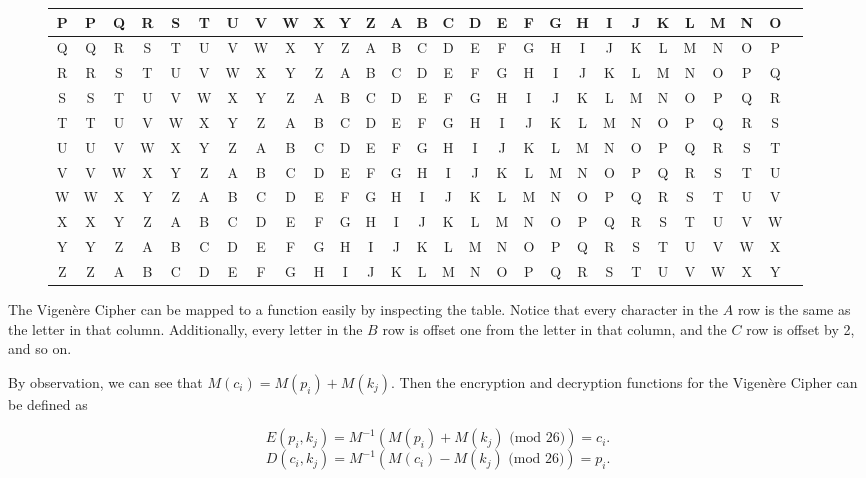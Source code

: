 \documentclass[12pt]{article}
\begin{document}
\begin{figure}[ht]
\begin{adjustbox}{max width=\textwidth}
\begin{tabular}{| c || c | c | c | c | c | c | c | c | c | c | c | c | c | c | c | c | c | c | c | c | c | c | c | c | c | c | c |}
P & P & Q & R & S & T & U & V & W & X & Y & Z & A & B & C & D & E & F & G & H & I & J & K & L & M & N & O \\ \hline
Q & Q & R & S & T & U & V & W & X & Y & Z & A & B & C & D & E & F & G & H & I & J & K & L & M & N & O & P \\ \hline
R & R & S & T & U & V & W & X & Y & Z & A & B & C & D & E & F & G & H & I & J & K & L & M & N & O & P & Q \\ \hline
S & S & T & U & V & W & X & Y & Z & A & B & C & D & E & F & G & H & I & J & K & L & M & N & O & P & Q & R \\ \hline
T & T & U & V & W & X & Y & Z & A & B & C & D & E & F & G & H & I & J & K & L & M & N & O & P & Q & R & S \\ \hline
U & U & V & W & X & Y & Z & A & B & C & D & E & F & G & H & I & J & K & L & M & N & O & P & Q & R & S & T \\ \hline
V & V & W & X & Y & Z & A & B & C & D & E & F & G & H & I & J & K & L & M & N & O & P & Q & R & S & T & U \\ \hline
W & W & X & Y & Z & A & B & C & D & E & F & G & H & I & J & K & L & M & N & O & P & Q & R & S & T & U & V \\ \hline
X & X & Y & Z & A & B & C & D & E & F & G & H & I & J & K & L & M & N & O & P & Q & R & S & T & U & V & W \\ \hline
Y & Y & Z & A & B & C & D & E & F & G & H & I & J & K & L & M & N & O & P & Q & R & S & T & U & V & W & X \\ \hline
Z & Z & A & B & C & D & E & F & G & H & I & J & K & L & M & N & O & P & Q & R & S & T & U & V & W & X & Y \\ \hline
	\end{tabular}
\end{adjustbox}


\end{figure}

The Vigen\`{e}re Cipher can be mapped to a function easily by inspecting the table. Notice that every character in the $A$ row is the same as the letter in that column. Additionally, every letter in the $B$ row is offset one from the letter in that column, and the $C$ row is offset by 2, and so on.

By observation, we can see that $M(c_i)=M(p_i)+M(k_j)$. Then the encryption and decryption functions for the Vigen\`{e}re Cipher can be defined as 

$$E(p_i, k_j)=M^{-1}(M(p_i)+M(k_j)\text{ (mod 26)})=c_i.$$
$$D(c_i, k_j)=M^{-1}(M(c_i)-M(k_j)\text{ (mod 26)})=p_i.$$
\end{document}
